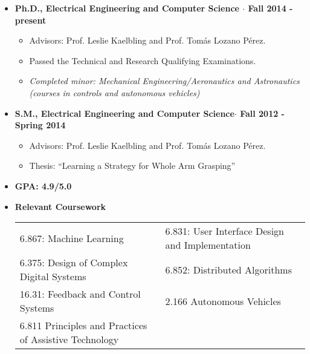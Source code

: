 \documentclass[10pt,letterpaper]{article}
\begin{document}
 \begin{itemize}
 	\item {\bf Ph.D., Electrical Engineering and Computer Science $\cdot$ Fall 2014 - present}
 	 \begin{itemize}
	\item Advisors: Prof. Leslie Kaelbling and Prof. Tom\'as Lozano P\'erez.
	\item Passed the Technical and Research Qualifying Examinations.
	\item {\em Completed minor: Mechanical Engineering/Aeronautics and Astronautics  (courses in controls and autonomous vehicles)}
	\end{itemize}
 \end{itemize}
 \begin{itemize}
 	\item {\bf S.M., Electrical Engineering and Computer Science$\cdot$ Fall 2012 - Spring 2014}
 	\begin{itemize}
	\item Advisors: Prof. Leslie Kaelbling and Prof. Tom\'as Lozano P\'erez.
	\item Thesis: ``Learning a Strategy for Whole Arm Grasping''
	\end{itemize}
	\item {\bf GPA:  4.9/5.0 }
	\item {\bf Relevant Coursework}\\
	  \begin{tabular}{l l}
      6.867: Machine Learning 
      & \hfill 6.831: User Interface Design and Implementation\\
      6.375: Design of Complex Digital Systems
      & \hfill 6.852: Distributed Algorithms\\
      16.31: Feedback and Control Systems
      & \hfill 2.166 Autonomous Vehicles\\
      6.811 Principles and Practices of Assistive Technology
     \end{tabular}
\end{itemize}
\end{document}
